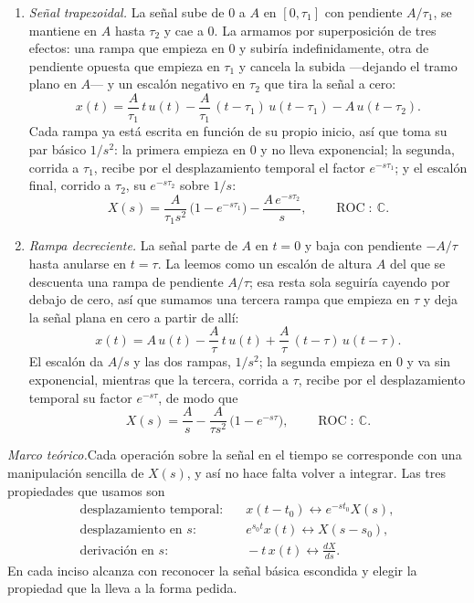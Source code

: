 \documentclass[10pt,a4paper]{article}
\newcommand{\ejercicio}[1]{\bigskip\noindent{\large\textbf{Ejercicio #1}}\par\nobreak\smallskip}
\newcommand{\teoria}[1]{\noindent\textit{Marco teórico.}\enspace #1\par\smallskip}
\begin{document}
\begin{enumerate}
	\item \emph{Señal trapezoidal.} La señal sube de $0$ a $A$ en $[0,\tau_1]$ con
	pendiente $A/\tau_1$, se mantiene en $A$ hasta $\tau_2$ y cae a $0$. La
	armamos por superposición de tres efectos: una rampa que empieza en $0$ y
	subiría indefinidamente, otra de pendiente opuesta que empieza en $\tau_1$
	y cancela la subida ---dejando el tramo plano en $A$--- y un escalón
	negativo en $\tau_2$ que tira la señal a cero:
	\[
		x(t)=\frac{A}{\tau_1}\,t\,u(t)-\frac{A}{\tau_1}\,(t-\tau_1)\,u(t-\tau_1)
		     -A\,u(t-\tau_2).
	\]
	Cada rampa ya está escrita en función de su propio inicio, así que toma
	su par básico $1/s^2$: la primera empieza en $0$ y no lleva exponencial; la
	segunda, corrida a $\tau_1$, recibe por el desplazamiento temporal el factor
	$e^{-s\tau_1}$; y el escalón final, corrido a $\tau_2$, su $e^{-s\tau_2}$
	sobre $1/s$:
	\[
		X(s)=\frac{A}{\tau_1 s^2}\,\bigl(1-e^{-s\tau_1}\bigr)
		     -\frac{A\,e^{-s\tau_2}}{s},
		\qquad \operatorname{ROC}:\ \mathbb{C}.
	\]

	\item \emph{Rampa decreciente.} La señal parte de $A$ en $t=0$ y baja con pendiente
	$-A/\tau$ hasta anularse en $t=\tau$. La leemos como un escalón de altura
	$A$ del que se descuenta una rampa de pendiente $A/\tau$; esa resta sola
	seguiría cayendo por debajo de cero, así que sumamos una tercera rampa que
	empieza en $\tau$ y deja la señal plana en cero a partir de allí:
	\[
		x(t)=A\,u(t)-\frac{A}{\tau}\,t\,u(t)+\frac{A}{\tau}\,(t-\tau)\,u(t-\tau).
	\]
	El escalón da $A/s$ y las dos rampas, $1/s^2$; la segunda empieza en $0$ y
	va sin exponencial, mientras que la tercera, corrida a $\tau$, recibe por el
	desplazamiento temporal su factor $e^{-s\tau}$, de modo que
	\[
		X(s)=\frac{A}{s}-\frac{A}{\tau s^2}\,\bigl(1-e^{-s\tau}\bigr),
		\qquad \operatorname{ROC}:\ \mathbb{C}.
	\]
\end{enumerate}

\ejercicio{2: propiedades}

\teoria{Cada operación sobre la señal en el tiempo se corresponde con una
manipulación sencilla de $X(s)$, y así no hace falta volver a integrar. Las
tres propiedades que usamos son
\[
	\begin{aligned}
		\text{desplazamiento temporal:}&\quad x(t-t_0)\leftrightarrow e^{-st_0}X(s),\\[2pt]
		\text{desplazamiento en }s:&\quad e^{s_0 t}x(t)\leftrightarrow X(s-s_0),\\[2pt]
		\text{derivación en }s:&\quad -t\,x(t)\leftrightarrow \frac{dX}{ds}.
	\end{aligned}
\]
En cada inciso alcanza con reconocer la señal básica escondida y elegir la
propiedad que la lleva a la forma pedida.}
\end{document}
